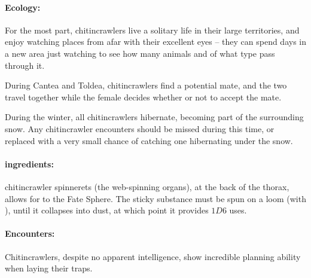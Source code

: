 \begin{multicols}{2}
\paragraph{Ecology:}
For the most part, chitincrawlers live a solitary life in their large territories, and enjoy watching places from afar with their excellent eyes -- they can spend days in a new area just watching to see how many animals and of what type pass through it.

During Cantea and Toldea, chitincrawlers find a potential mate, and the two travel together while the female decides whether or not to accept the mate.

During the winter, all chitincrawlers hibernate, becoming part of the surrounding snow.
Any chitincrawler encounters should be missed during this time, or replaced with a very small chance of catching one hibernating under the snow.

\paragraph{\Glspl{ingredient}:}
chitincrawler spinnerets (the web-spinning organs), at the back of the thorax, allows for  to the Fate Sphere.
The sticky substance must be spun on a loom (with ), until it collapses into dust, at which point it provides $1D6$ uses.

\paragraph{Encounters:} Chitincrawlers, despite no apparent intelligence, show incredible planning ability when laying their traps.

\begin{itemize}


\end{itemize}
\end{multicols}
